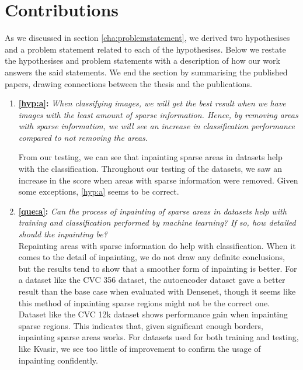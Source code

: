 \section{Contributions}
As we discussed in section \ref{cha:problemstatement}, we derived two hypothesises and a problem statement related to each of the hypothesises.
Below we restate the hypothesises and problem statements with a description of how our work answers the said statements.
We end the section by summarising the published papers, drawing connections between the thesis and the publications.\\
\vspace{5px}
\begin{enumerate}

\item \textbf{\ref{hyp:a}:} \textit{When classifying images, we will get the best result when we have images with the least amount of sparse information. Hence, by removing areas with sparse information, we will see an increase in classification performance compared to not removing the areas.}

From our testing, we can see that inpainting sparse areas in datasets help with the classification. Throughout our testing of the datasets, we saw an increase in the score when areas with sparse information were removed. Given some exceptions, \ref{hyp:a} seems to be correct.
    


\item \textbf{\ref{que:a}:} \textit{ Can the process of inpainting of sparse areas in datasets help with training and classification performed by machine learning? If so, how detailed should the inpainting be?}\\ 
    
Repainting areas with sparse information do help with classification. When it comes to the detail of inpainting, we do not draw any definite conclusions, but the results tend to show that a smoother form of inpainting is better.
For a dataset like the CVC 356 dataset, the autoencoder dataset gave a better result than the base case when evaluated with Densenet, though it seems like this method of inpainting sparse regions might not be the correct one. 
Dataset like the CVC 12k dataset shows performance gain when inpainting sparse regions. This indicates that, given significant enough borders, inpainting sparse areas works.
For datasets used for both training and testing, like Kvasir, we see too little of improvement to confirm the usage of inpainting confidently.
    



\end{enumerate}

